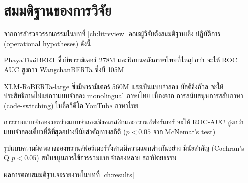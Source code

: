 \section{สมมติฐานของการวิจัย}
\label{sec:intro-hypotheses}

จากการสำรวจวรรณกรรมในบทที่ \ref{ch:litreview} คณะผู้วิจัยตั้งสมมติฐานเชิง
ปฏิบัติการ (operational hypotheses) ดังนี้

\begin{description}[leftmargin=2.5em,style=nextline]
  \item[$H_1$:] PhayaThaiBERT ซึ่งมีพารามิเตอร์ 278M และฝึกบนคลังภาษาไทยที่ใหญ่
    กว่า จะให้ ROC-AUC สูงกว่า WangchanBERTa ซึ่งมี 105M
  \item[$H_2$:] XLM-RoBERTa-large ซึ่งมีพารามิเตอร์ 560M และเป็นแบบจำลอง
    มัลติลิงกัวล จะให้ประสิทธิภาพไม่แย่กว่าแบบจำลอง monolingual ภาษาไทย เนื่องจาก
    การสนับสนุนการสลับภาษา (code-switching) ในชื่อวิดีโอ YouTube ภาษาไทย
  \item[$H_3$:] การรวมแบบจำลองระหว่างแบบจำลองเชิงคลาสสิกและทรานส์ฟอร์เมอร์
    จะให้ ROC-AUC สูงกว่าแบบจำลองเดี่ยวที่ดีที่สุดอย่างมีนัยสำคัญทางสถิติ
    ($p < 0.05$ จาก McNemar's test)
  \item[$H_4$:] รูปแบบความผิดพลาดของทรานส์ฟอร์เมอร์ทั้งสามมีความแตกต่างกันอย่าง
    มีนัยสำคัญ (Cochran's Q $p < 0.05$) สนับสนุนการใช้การรวมแบบจำลองหลาย
    สถาปัตยกรรม
\end{description}

ผลการตอบสมมติฐานจะรายงานในบทที่ \ref{ch:results}
